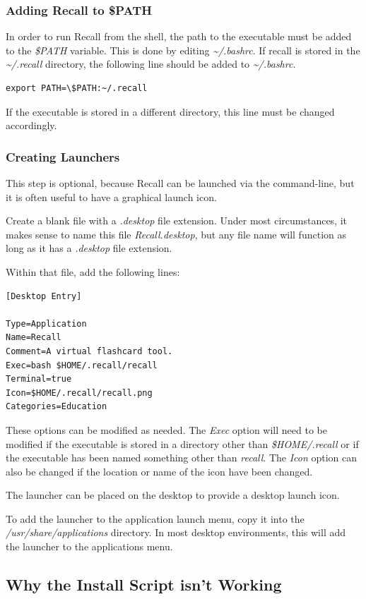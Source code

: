 \documentclass[letterpaper]{article}
\begin{document}
\subsubsection{Adding Recall to \$PATH}
In order to run Recall from the shell, the path to the executable must be added to the \textit{\$PATH} variable. This is done by editing \textit{\~{}/.bashrc}. If recall is stored in the \textit{\~{}/.recall} directory, the following line should be added to \textit{\~{}/.bashrc}.
\begin{verbatim}
export PATH=\$PATH:~/.recall
\end{verbatim}
If the executable is stored in a different directory, this line must be changed accordingly.

\subsubsection{Creating Launchers}
This step is optional, because Recall can be launched via the command-line, but it is often useful to have a graphical launch icon.

Create a blank file with a \textit{.desktop} file extension. Under most circumstances, it makes sense to name this file \textit{Recall.desktop}, but any file name will function as long as it has a \textit{.desktop} file extension.

Within that file, add the following lines:
\begin{verbatim}
[Desktop Entry]

Type=Application
Name=Recall
Comment=A virtual flashcard tool.
Exec=bash $HOME/.recall/recall
Terminal=true
Icon=$HOME/.recall/recall.png
Categories=Education
\end{verbatim}

These options can be modified as needed. The \textit{Exec} option will need to be modified if the executable is stored in a directory other than \textit{\$HOME/.recall} or if the executable has been named something other than \textit{recall}. The \textit{Icon} option can also be changed if the location or name of the icon have been changed.

The launcher can be placed on the desktop to provide a desktop launch icon.

To add the launcher to the application launch menu, copy it into the \textit{/usr/share/applications} directory. In most desktop environments, this will add the launcher to the applications menu.

\subsection{Why the Install Script isn't Working} \label{why the install script might not work}
\end{document}

